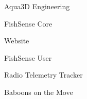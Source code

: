 \item Aqua3D Engineering
\item FishSense Core
\item Website
\item FishSense User
\item Radio Telemetry Tracker
\item Baboons on the Move
